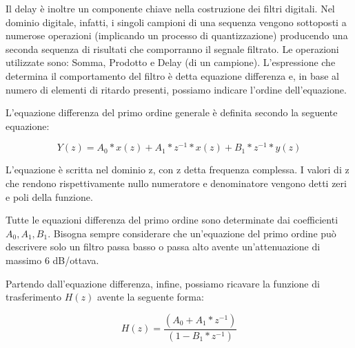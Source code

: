 Il delay è inoltre un componente chiave nella costruzione dei filtri digitali.
Nel dominio digitale, infatti, i singoli campioni di una sequenza vengono sottoposti a numerose operazioni (implicando un processo di quantizzazione) producendo una seconda sequenza di risultati che comporranno il segnale filtrato.
Le operazioni utilizzate sono: Somma, Prodotto e Delay (di un campione).
L’espressione che determina il comportamento del filtro è detta equazione differenza e, in base al numero di elementi di ritardo presenti, possiamo indicare l’ordine dell’equazione.

L’equazione differenza del primo ordine generale è definita secondo la seguente equazione:

\begin{equation}
Y(z)=A_0*x(z) + A_1*z^{-1}*x(z) + B_1*z^{-1}*y(z)
\end{equation}

L’equazione è scritta nel dominio z, con z detta frequenza complessa.
I valori di z che rendono rispettivamente nullo numeratore e denominatore vengono detti zeri e poli della funzione.

Tutte le equazioni differenza del primo ordine sono determinate dai coefficienti $A_0, A_1,B_1$.
Bisogna sempre considerare che un’equazione del primo ordine può descrivere solo un filtro passa basso o passa alto avente un’attenuazione di massimo 6 dB/ottava.

Partendo dall’equazione differenza, infine, possiamo ricavare la funzione di trasferimento $H(z)$ avente la seguente forma:

\begin{equation}
H(z)=\frac{(A_0 + A_1 * z^{-1})} {(1-B_1 * z^{-1})}
\end{equation}
